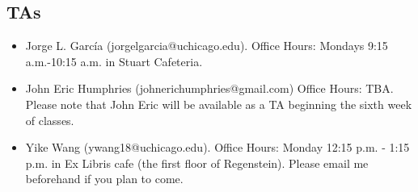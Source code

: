 \documentclass[12pt]{article}
\begin{document}
\subsection{TAs}
\begin{itemize}
\item Jorge L. Garc\'{i}a (jorgelgarcia@uchicago.edu). Office Hours: Mondays 9:15 a.m.-10:15 a.m. in Stuart Cafeteria.  
\item John Eric Humphries (johnerichumphries@gmail.com) Office Hours: TBA. Please note that John Eric will be available as a TA beginning the sixth week of classes.
\item Yike Wang (ywang18@uchicago.edu). Office Hours: Monday 12:15 p.m. - 1:15 p.m. in Ex Libris cafe (the first floor of Regenstein). Please email me beforehand if you plan to come.

\end{itemize}
\end{document}
